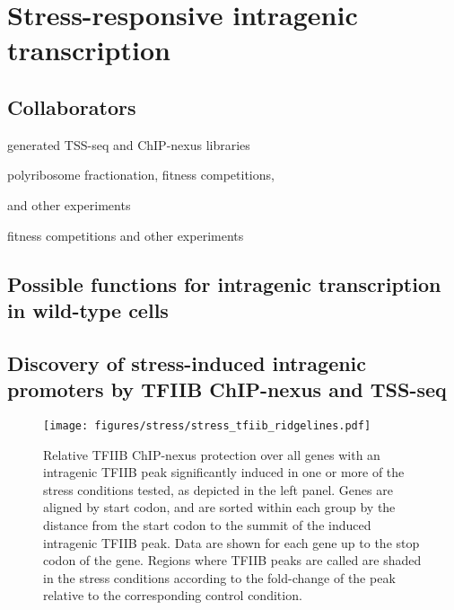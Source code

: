 \chapter{Stress-responsive intragenic transcription}
\label{chapter:stress}

\section{Collaborators}

\begin{description}[align=right, labelwidth=5cm, noitemsep]
    \item [Steve Doris] generated TSS-seq and ChIP-nexus libraries
    \item [Dan Spatt] polyribosome fractionation, fitness competitions,
    \item [] and other experiments
    \item [James Warner] fitness competitions and other experiments
\end{description}

\section{Possible functions for intragenic transcription in wild-type cells}

\section{Discovery of stress-induced intragenic promoters by TFIIB ChIP-nexus and TSS-seq}

\begin{sidewaysfigure}
    \texttt{[image: figures/stress/stress\_tfiib\_ridgelines.pdf]}
    \caption[TFIIB ChIP-nexus protection over all genes with stress-induced intragenic TFIIB peaks.]{Relative TFIIB ChIP-nexus protection over all genes with an intragenic TFIIB peak significantly induced in one or more of the stress conditions tested, as depicted in the left panel. Genes are aligned by start codon, and are sorted within each group by the distance from the start codon to the summit of the induced intragenic TFIIB peak. Data are shown for each gene up to the stop codon of the gene. Regions where TFIIB peaks are called are shaded in the stress conditions according to the fold-change of the peak relative to the corresponding control condition.}
    \label{fig:stress_tfiib_ridgelines}
\end{sidewaysfigure}

